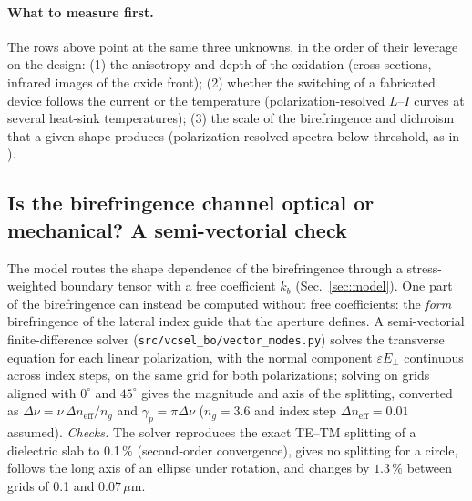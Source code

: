 \paragraph{What to measure first.} The rows above point at the same three unknowns, in the order of their leverage on the design: (1) the anisotropy and depth of the oxidation (cross-sections, infrared images of the oxide front); (2) whether the switching of a fabricated device follows the current or the temperature (polarization-resolved $L$--$I$ curves at several heat-sink temperatures); (3) the scale of the birefringence and dichroism that a given shape produces (polarization-resolved spectra below threshold, as in \cite{choquette1995}).

\subsection{Is the birefringence channel optical or mechanical? A semi-vectorial check}\label{sec:formbiref}
The model routes the shape dependence of the birefringence through a stress-weighted boundary tensor with a free coefficient $k_b$ (Sec.~\ref{sec:model}). One part of the birefringence can instead be computed without free coefficients: the \emph{form} birefringence of the lateral index guide that the aperture defines. A semi-vectorial finite-difference solver (\texttt{src/vcsel\_bo/vector\_modes.py}) solves the transverse equation for each linear polarization, with the normal component $\varepsilon E_\perp$ continuous across index steps, on the same grid for both polarizations; solving on grids aligned with $0^\circ$ and $45^\circ$ gives the magnitude and axis of the splitting, converted as $\Delta\nu=\nu\,\Delta n_{\mathrm{eff}}/n_g$ and $\gamma_p=\pi\Delta\nu$ ($n_g=3.6$ and index step $\Delta n_{\mathrm{eff}}=0.01$ assumed).
\emph{Checks.} The solver reproduces the exact TE--TM splitting of a dielectric slab to 0.1\,\% (second-order convergence), gives no splitting for a circle, follows the long axis of an ellipse under rotation, and changes by \(1.3\,\%\) between grids of 0.1 and 0.07\,$\mu$m.
